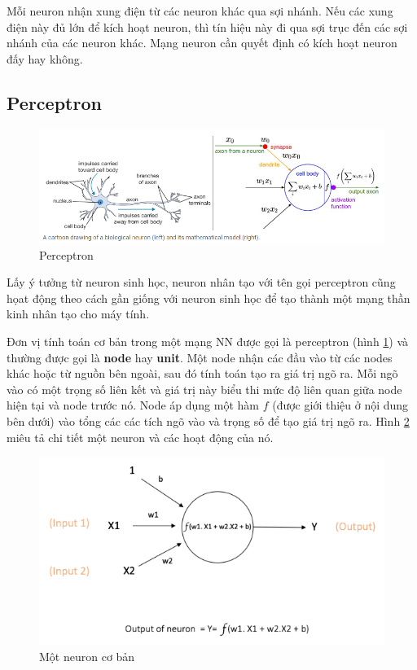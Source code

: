 Mỗi neuron nhận xung điện từ các neuron khác qua sợi nhánh. Nếu các xung điện này đủ lớn để kích hoạt neuron, thì tín hiệu này đi qua sợi trục đến các sợi nhánh của các neuron khác. Mạng neuron cần quyết định có kích hoạt neuron đấy hay không.


\subsection{Perceptron}
\label{s:perceptron}

\begin{figure}[htp]
\begin{center}
\includegraphics[scale=0.8]{chap2/c2_figs/perceptron.PNG}
\end{center}
\caption{Perceptron}
\label{fig:perceptron}
\end{figure}


Lấy ý tưởng từ neuron sinh học, neuron nhân tạo với tên gọi perceptron cũng họat động theo cách gần giống với neuron sinh học để tạo thành một mạng thần kinh nhân tạo cho máy tính.

Đơn vị tính toán cơ bản trong một mạng NN được gọi là perceptron (hình \ref{fig:perceptron}) và thường được gọi là \textbf{node} hay \textbf{unit}. Một node nhận các đầu vào từ các nodes khác hoặc từ nguồn bên ngoài, sau đó tính toán tạo ra giá trị ngõ ra. Mỗi ngõ vào có một trọng số liên kết và giá trị này biểu thi mức độ liên quan giữa node hiện tại và node trước nó. Node áp dụng một hàm $f$ (được giới thiệu ở nội dung bên dưới) vào tổng các các tích ngõ vào và trọng số để tạo giá trị ngõ ra. Hình \ref{fig:single_neuron} miêu tả chi tiết một neuron và các hoạt động của nó.

\FloatBarrier
\begin{figure}[htp]
\begin{center}
\includegraphics[scale=1]{chap2/c2_figs/single_neuron.PNG}
\end{center}
\caption{Một neuron cơ bản}
\label{fig:single_neuron}
\end{figure}
\FloatBarrier

